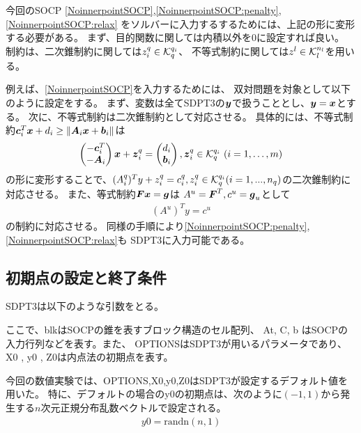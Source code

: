 \documentclass[11pt,a4paper,dvipdfmx,titlepage,uplatex]{jsarticle}
\theoremstyle{mystyle}
\newcommand{\0}{\mathbf{0}}
\def\b{\mbox{\boldmath $b$}}
\def\c{\mbox{\boldmath $c$}}
\def\g{\mbox{\boldmath $g$}}
\def\x{\mbox{\boldmath $x$}}
\def\y{\mbox{\boldmath $y$}}
\def\z{\mbox{\boldmath $z$}}
\def\A{\mbox{\boldmath $A$}}
\def\F{\mbox{\boldmath $F$}}
\def\KC{\mbox{$\cal K$}}
\def\Real{\mbox{$\mathbb{R}$}}
\begin{document}
今回のSOCP
\eqref{NoinnerpointSOCP},\eqref{NoinnerpointSOCP:penalty},\eqref{NoinnerpointSOCP:relax}
をソルバーに入力するするためには、上記の形に変形する必要がある。
まず、目的関数に関しては内積以外を$0$に設定すれば良い。
制約は、二次錐制約に関しては$z_i^q \in \KC_q^{q_i}$、
不等式制約に関しては$z^l \in \KC_l^{n_l}$を用いる。%

例えば、\eqref{NoinnerpointSOCP}を入力するためには、
双対問題を対象として以下のように設定をする。
まず、変数は全てSDPT3の$\y$で扱うこととし、$\y = \x$とする。
次に、不等式制約は二次錐制約として対応させる。
具体的には、不等式制約$\c_i^T \x + d_i \ge \|\A_i \x + \b_i\|$は
\begin{align}
  \begin{pmatrix}
    - \c_i^T \\
    - \A_i \\
  \end{pmatrix}
  \x + \z_i^q =
  \begin{pmatrix}
    d_i \\
    \b_i \\
  \end{pmatrix} , \z_i^q \in \KC_q^{q_i} \ (i = 1 , \dots , m)
\end{align}
の形に変形することで、$(A_i^q)^T y + z_i^q = c_i^q, z_i^q \in \KC_q^{q_i} (i = 1,...,n_q)$の二次錐制約に対応させる。
また、等式制約$\F \x = \g$は
$A^u = \F^T , c^u = \g_u$として
\begin{align}
  (A^u)^T y = c^u
\end{align}
の制約に対応させる。
同様の手順により\eqref{NoinnerpointSOCP:penalty},\eqref{NoinnerpointSOCP:relax}も
SDPT3に入力可能である。

\subsection{初期点の設定と終了条件}\label{sec:parameter_settings}

SDPT3は以下のような引数をとる。
\begin{center}
\end{center}
ここで、blkはSOCPの錐を表すブロック構造のセル配列、
At, C, b はSOCPの入力行列などを表す。また、
OPTIONSはSDPT3が用いるパラメータであり、
X0 , y0 , Z0は内点法の初期点を表す。

今回の数値実験では、OPTIONS,X0,y0,Z0はSDPT3が設定するデフォルト値を用いた。
特に、デフォルトの場合のy0の初期点は、次のように$(-1,1)$から発生する$n$次元正規分布乱数ベクトルで設定される。
\begin{align}
  y0 = \text{randn}(n,1)
\end{align}
\end{document}
